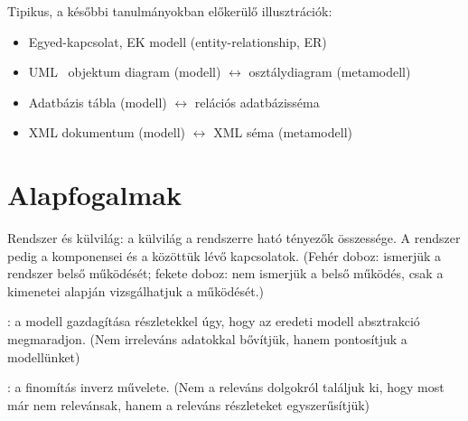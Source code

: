 Tipikus, a későbbi tanulmányokban előkerülő illusztrációk:

\begin{itemize}
	\item Egyed-kapcsolat, EK modell (entity-relationship, ER)
	\item UML~\cite{UML} objektum diagram (modell) $\leftrightarrow$ osztálydiagram (metamodell)
	\item Adatbázis tábla (modell) $\leftrightarrow$ relációs adatbázisséma
	\item XML dokumentum (modell) $\leftrightarrow$ XML séma (metamodell)
\end{itemize}

\section{Alapfogalmak}

\begin{definicio}
	Rendszer és külvilág: a külvilág a rendszerre ható tényezők összessége. A rendszer pedig a komponensei és a közöttük lévő kapcsolatok. (Fehér doboz: ismerjük a rendszer belső működését; fekete doboz: nem ismerjük a belső működés, csak a kimenetei alapján vizsgálhatjuk a működését.)
\end{definicio}


\begin{definicio}
	: a modell gazdagítása részletekkel úgy, hogy az eredeti modell absztrakció megmaradjon. (Nem irreleváns adatokkal bővítjük, hanem pontosítjuk a modellünket)
\end{definicio}

\begin{definicio}
	: a finomítás inverz művelete. (Nem a releváns dolgokról találjuk ki, hogy most már nem relevánsak, hanem a releváns részleteket egyszerűsítjük)
\end{definicio}

